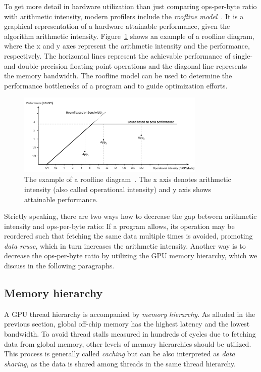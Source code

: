 To get more detail in hardware utilization than just comparing ops-per-byte ratio with arithmetic intensity, modern profilers include the \emph{roofline model}~\cite{williams2009roofline}. It is a graphical representation of a hardware attainable performance, given the algorithm arithmetic intensity. Figure~\ref{fig:roof} shows an example of a roofline diagram, where the x and y axes represent the arithmetic intensity and the performance, respectively. The horizontal lines represent the achievable performance of single- and double-precision floating-point operations and the diagonal line represents the memory bandwidth. The roofline model can be used to determine the performance bottlenecks of a program and to guide optimization efforts.

\begin{figure}
    \centering
    \includegraphics[width=0.8\textwidth]{img/Example_of_a_Roofline_model.pdf}
    \caption{The example of a roofline diagram~\cite{wiki:Roofline_model}. The x axis denotes arithmetic intensity (also called operational intensity) and y axis shows attainable performance.}
    \label{fig:roof}
\end{figure}

Strictly speaking, there are two ways how to decrease the gap between arithmetic intensity and ops-per-byte ratio: If a program allows, its operation may be reordered such that fetching the same data multiple times is avoided, promoting \emph{data reuse}, which in turn increases the arithmetic intensity. Another way is to decrease the ops-per-byte ratio by utilizing the GPU memory hierarchy, which we discuss in the following paragraphs.

\subsection{Memory hierarchy}
\label{sec:memory_hier}

A GPU thread hierarchy is accompanied by \emph{memory hierarchy}. As alluded in the previous section, global off-chip memory has the highest latency and the lowest bandwidth. To avoid thread stalls measured in hundreds of cycles due to fetching data from global memory, other levels of memory hierarchies should be utilized. This process is generally called \emph{caching} but can be also interpreted as \emph{data sharing}, as the data is shared among threads in the same thread hierarchy.

